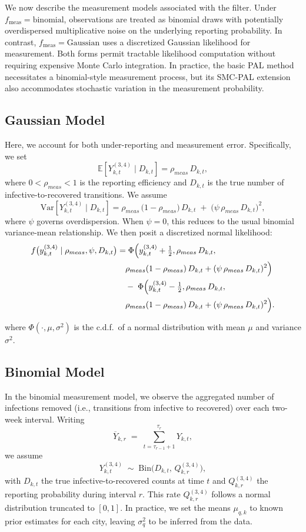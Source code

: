 \documentclass{article}
\newcommand\fmeas{f_{\mathrm{meas}}}
\newcommand\fmeasBinomial{\mathrm{binomial}}
\newcommand\fmeasGaussian{\mathrm{Gaussian}}
\begin{document}
We now describe the measurement models associated with the filter. Under $\fmeas=\fmeasBinomial$, observations are treated as binomial draws with potentially overdispersed multiplicative noise on the underlying reporting probability. In contrast, $\fmeas=\fmeasGaussian$ uses a discretized Gaussian likelihood for measurement. Both forms permit tractable likelihood computation without requiring expensive Monte Carlo integration. In practice, the basic PAL method necessitates a binomial-style measurement process, but its SMC-PAL extension also accommodates stochastic variation in the measurement probability.

\subsection*{Gaussian Model}

Here, we account for both under-reporting and measurement error. Specifically, we set
\[
\mathbb{E}[Y_{k,t}^{(3,4)} \mid D_{k,t}] = \rho_{meas}\,D_{k,t},
\]
where $0 < \rho_{meas} < 1$ is the reporting efficiency and $D_{k,t}$ is the true number of infective-to-recovered transitions. We assume
\[
\mathrm{Var}[Y_{k,t}^{(3,4)} \mid D_{k,t}] 
= \rho_{meas}\,\bigl(1 - \rho_{meas}\bigr)\,D_{k,t} 
\;+\; 
\bigl(\psi\,\rho_{meas}\,D_{k,t}\bigr)^{2},
\]
where $\psi$ governs overdispersion. When $\psi=0$, this reduces to the usual binomial variance-mean relationship. We then posit a discretized normal likelihood:
\[
\begin{aligned}
f\bigl(y_{k,t}^{(3,4)} \mid \rho_{meas},\psi,D_{k,t}\bigr)
&=
\Phi\Bigl(
  y_{k,t}^{(3,4)} + \tfrac{1}{2},\rho_{meas}\,D_{k,t},\\
&\quad
  \rho_{meas}(1-\rho_{meas})\,D_{k,t}
    + (\psi\,\rho_{meas}\,D_{k,t})^{2}
\Bigr)\\
&\quad-\;
\Phi\Bigl(
  y_{k,t}^{(3,4)} - \tfrac{1}{2},
  \rho_{meas}\,D_{k,t},\\
&\quad
  \rho_{meas}(1-\rho_{meas})\,D_{k,t}
    + (\psi\,\rho_{meas}\,D_{k,t})^{2}
\Bigr).
\end{aligned}
\]

where $\Phi(\cdot,\mu,\sigma^2)$ is the c.d.f.\ of a normal distribution with mean $\mu$ and variance $\sigma^2$.

\subsection*{Binomial Model}

In the binomial measurement model, we observe the aggregated number of infections removed (i.e., transitions from infective to recovered) over each two-week interval. Writing
\[
\overline{Y}_{k,r} \;=\; \sum_{t=\tau_{r-1}+1}^{\tau_r} Y_{k,t},
\]
we assume 
\[
Y_{k,t}^{(3,4)} \;\sim\; \mathrm{Bin}\bigl(D_{k,t},\,Q_{k,r}^{(3,4)}\bigr),
\]
with $D_{k,t}$ the true infective-to-recovered counts at time $t$ and $Q_{k,r}^{(3,4)}$ the reporting probability during interval $r$. This rate $Q_{k,r}^{(3,4)}$ follows a normal distribution truncated to $[0,1]$. In practice, we set the means $\mu_{q,k}$ to known prior estimates for each city, leaving $\sigma_q^2$ to be inferred from the data.  
\end{document}
